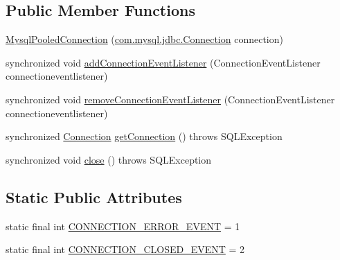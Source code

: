 \subsection*{Public Member Functions}
\begin{DoxyCompactItemize}
\item 
\mbox{\hyperlink{classcom_1_1mysql_1_1jdbc_1_1jdbc2_1_1optional_1_1_mysql_pooled_connection_a53e74968220d04cfe81acce45b533349}{Mysql\+Pooled\+Connection}} (\mbox{\hyperlink{interfacecom_1_1mysql_1_1jdbc_1_1_connection}{com.\+mysql.\+jdbc.\+Connection}} connection)
\item 
synchronized void \mbox{\hyperlink{classcom_1_1mysql_1_1jdbc_1_1jdbc2_1_1optional_1_1_mysql_pooled_connection_a63cefd879db6d640b3ad4660b2c6afa1}{add\+Connection\+Event\+Listener}} (Connection\+Event\+Listener connectioneventlistener)
\item 
synchronized void \mbox{\hyperlink{classcom_1_1mysql_1_1jdbc_1_1jdbc2_1_1optional_1_1_mysql_pooled_connection_ad85f5b857c45a393749cf8e57e17a7be}{remove\+Connection\+Event\+Listener}} (Connection\+Event\+Listener connectioneventlistener)
\item 
synchronized \mbox{\hyperlink{interfacecom_1_1mysql_1_1jdbc_1_1_connection}{Connection}} \mbox{\hyperlink{classcom_1_1mysql_1_1jdbc_1_1jdbc2_1_1optional_1_1_mysql_pooled_connection_ac6c1ba2d95a0554270f8e7eba0e10c24}{get\+Connection}} ()  throws S\+Q\+L\+Exception 
\item 
synchronized void \mbox{\hyperlink{classcom_1_1mysql_1_1jdbc_1_1jdbc2_1_1optional_1_1_mysql_pooled_connection_ab842c498acffec244987eaf732e3e753}{close}} ()  throws S\+Q\+L\+Exception 
\end{DoxyCompactItemize}
\subsection*{Static Public Attributes}
\begin{DoxyCompactItemize}
\item 
static final int \mbox{\hyperlink{classcom_1_1mysql_1_1jdbc_1_1jdbc2_1_1optional_1_1_mysql_pooled_connection_a5df937fa6e5151344d5dfff40acc957d}{C\+O\+N\+N\+E\+C\+T\+I\+O\+N\+\_\+\+E\+R\+R\+O\+R\+\_\+\+E\+V\+E\+NT}} = 1
\item 
static final int \mbox{\hyperlink{classcom_1_1mysql_1_1jdbc_1_1jdbc2_1_1optional_1_1_mysql_pooled_connection_abcda46fb6d21e885e2087bf317c4b761}{C\+O\+N\+N\+E\+C\+T\+I\+O\+N\+\_\+\+C\+L\+O\+S\+E\+D\+\_\+\+E\+V\+E\+NT}} = 2
\end{DoxyCompactItemize}
